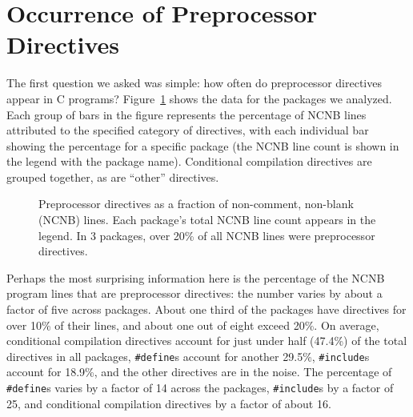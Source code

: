 \documentclass[11pt]{article}
\begin{document}
\section{Occurrence of Preprocessor Directives}
\label{sec:directives}

The first question we asked was simple: how often do
preprocessor directives appear in C programs?
Figure~\ref{fig:directives_per_ncnb} shows the data for the packages we
analyzed.  Each group of bars in the figure represents the percentage of
NCNB lines attributed to the specified category of directives, with each
individual bar showing the percentage for a specific package (the NCNB
line count is shown in the legend with the package name).  Conditional
compilation directives are grouped together, as are ``other'' directives.


\begin{figure}
\centerline{}
\caption{Preprocessor directives as a fraction of non-comment,
  non-blank (NCNB) lines.  Each package's total NCNB line count appears
  in the legend.  In 3 packages, over 20\% of all NCNB lines were
  preprocessor directives.}
\label{fig:directives_per_ncnb}
\end{figure}

Perhaps the most surprising information here is the percentage of the
NCNB program lines that are preprocessor directives: the number varies
by about a factor of five across packages.  About one third of the
packages have directives for over 10\% of their lines, and about one
out of eight exceed 20\%.  On average, conditional compilation
directives account for just under half (47.4\%) of the total
directives in all packages, {\tt \#define}s account for another
29.5\%, {\tt \#include}s account for 18.9\%, and the other directives
are in the noise.
The percentage of {\tt \#define}s varies by a factor of 14
across the packages, {\tt \#include}s by a factor of 25, and
conditional compilation directives by a factor of about 16.
\end{document}
